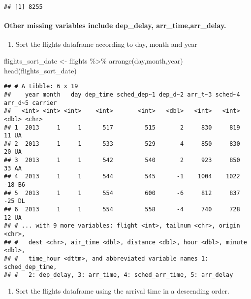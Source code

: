 \documentclass[
]{article}
\newenvironment{Shaded}{\begin{snugshade}}{\end{snugshade}}
\newcommand{\FunctionTok}[1]{\textcolor[rgb]{0.00,0.00,0.00}{#1}}
\newcommand{\NormalTok}[1]{#1}
\newcommand{\OtherTok}[1]{\textcolor[rgb]{0.56,0.35,0.01}{#1}}
\newcommand{\SpecialCharTok}[1]{\textcolor[rgb]{0.00,0.00,0.00}{#1}}
\providecommand{\tightlist}{%
  \setlength{\itemsep}{0pt}\setlength{\parskip}{0pt}}
\begin{document}
\begin{verbatim}
## [1] 8255
\end{verbatim}

\hypertarget{other-missing-variables-include-dep_delay-arr_timearr_delay.}{%
\paragraph{Other missing variables include dep\_delay,
arr\_time,arr\_delay.}\label{other-missing-variables-include-dep_delay-arr_timearr_delay.}}

\begin{enumerate}
\def\labelenumi{\arabic{enumi}.}
\setcounter{enumi}{3}
\tightlist
\item
  Sort the flights dataframe according to day, month and year
\end{enumerate}

\begin{Shaded}
\begin{Highlighting}[]
\NormalTok{flights\_sort\_date }\OtherTok{\textless{}{-}}\NormalTok{ flights }\SpecialCharTok{\%\textgreater{}\%} \FunctionTok{arrange}\NormalTok{(day,month,year)}
\FunctionTok{head}\NormalTok{(flights\_sort\_date)}
\end{Highlighting}
\end{Shaded}

\begin{verbatim}
## # A tibble: 6 x 19
##    year month   day dep_time sched_dep~1 dep_d~2 arr_t~3 sched~4 arr_d~5 carrier
##   <int> <int> <int>    <int>       <int>   <dbl>   <int>   <int>   <dbl> <chr>  
## 1  2013     1     1      517         515       2     830     819      11 UA     
## 2  2013     1     1      533         529       4     850     830      20 UA     
## 3  2013     1     1      542         540       2     923     850      33 AA     
## 4  2013     1     1      544         545      -1    1004    1022     -18 B6     
## 5  2013     1     1      554         600      -6     812     837     -25 DL     
## 6  2013     1     1      554         558      -4     740     728      12 UA     
## # ... with 9 more variables: flight <int>, tailnum <chr>, origin <chr>,
## #   dest <chr>, air_time <dbl>, distance <dbl>, hour <dbl>, minute <dbl>,
## #   time_hour <dttm>, and abbreviated variable names 1: sched_dep_time,
## #   2: dep_delay, 3: arr_time, 4: sched_arr_time, 5: arr_delay
\end{verbatim}

\begin{enumerate}
\def\labelenumi{\arabic{enumi}.}
\setcounter{enumi}{4}
\tightlist
\item
  Sort the flights dataframe using the arrival time in a descending
  order.
\end{enumerate}
\end{document}
